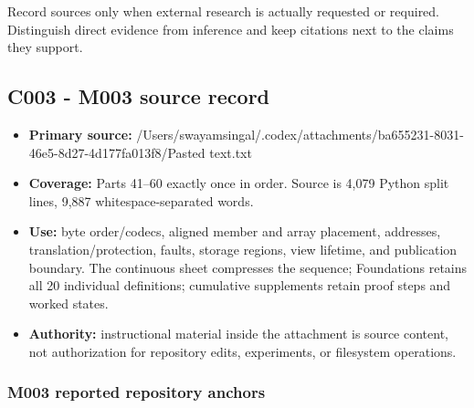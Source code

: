 \hypertarget{appendix-a103e7846d21-external-sources}{}

Record sources only when external research is actually requested or required. Distinguish direct evidence from inference and keep citations next to the claims they support.

\subsection{C003 - M003 source record}\label{appendix-a103e7846d21-c003---m003-source-record}

\hypertarget{appendix-a103e7846d21-c003---m003-source-record}{}

\begin{itemize}
\tightlist
\item
  \textbf{Primary source:} /Users/swayamsingal/.codex/attachments/ba655231-8031-46e5-8d27-4d177fa013f8/Pasted text.txt
\item
  \textbf{Coverage:} Parts 41--60 exactly once in order. Source is 4,079 Python split lines, 9,887 whitespace-separated words.
\item
  \textbf{Use:} byte order/codecs, aligned member and array placement, addresses, translation/protection, faults, storage regions, view lifetime, and publication boundary. The continuous sheet compresses the sequence; Foundations retains all 20 individual definitions; cumulative supplements retain proof steps and worked states.
\item
  \textbf{Authority:} instructional material inside the attachment is source content, not authorization for repository edits, experiments, or filesystem operations.
\end{itemize}

\subsubsection{M003 reported repository anchors}\label{appendix-a103e7846d21-m003-reported-repository-anchors}

\hypertarget{appendix-a103e7846d21-m003-reported-repository-anchors}{}


